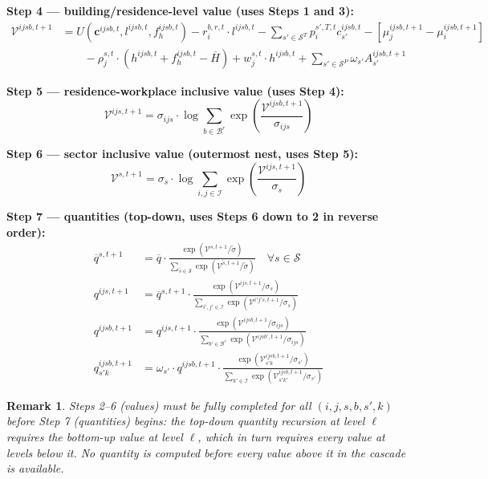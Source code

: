 \documentclass[11pt,a4paper]{article}
\newtheorem{remark}{Remark}
\newcommand{\IV}{\mathcal{V}}
\begin{document}
\textbf{Step 4 — building/residence-level value (uses Steps 1 and 3):}
\begin{align}
    \IV^{ijsb,t+1} &= U(\mathbf{c}^{ijsb,t}, l^{ijsb,t}, f^{ijsb,t}_h) - r^{b,r,t}_i \cdot l^{ijsb,t} - \sum_{s' \in \mathcal{S}^T} p^{s',T,t}_i c^{ijsb,t}_{s'} - \left[\mu^{ijsb, t+1}_{j} - \mu^{ijsb, t+1}_{i}\right] \nonumber \\
    &\qquad - \rho^{s,t}_j \cdot \left( h^{ijsb,t} + f^{ijsb,t}_h - \overline{H} \right) + w_j^{s,t} \cdot h^{ijsb,t} + \sum_{s' \in \mathcal{S}^P} \omega_{s'} A^{ijsb, t+1}_{s'}
    \label{eq:iv_building}
\end{align}

\textbf{Step 5 — residence-workplace inclusive value (uses Step 4):}
\begin{equation}
    \IV^{ijs, t+1} = \sigma_{ijs} \cdot \log \sum_{b \in \mathcal{B}^r} \exp\left(\frac{\IV^{ijsb,t+1}}{\sigma_{ijs}}\right)
    \label{eq:iv_location}
\end{equation}

\textbf{Step 6 — sector inclusive value (outermost nest, uses Step 5):}
\begin{equation}
    \IV^{s, t+1} = \sigma_s \cdot \log \sum_{i,j \in \mathcal{I}} \exp\left(\frac{\IV^{ijs,t+1}}{\sigma_s}\right)
    \label{eq:iv_sector}
\end{equation}

\textbf{Step 7 — quantities (top-down, uses Steps 6 down to 2 in reverse order):}
\begin{align}
    \overline{q}^{s, t+1} &= \overline{q} \cdot \frac{\exp\left(\IV^{s,t+1} / \tilde{\sigma}\right)}{\sum_{\tilde{s} \in \mathcal{S}} \exp\left(\IV^{\tilde{s},t+1} / \tilde{\sigma}\right)} \quad \forall s \in \mathcal{S} \\
    q^{ijs, t+1} &= \overline{q}^{s,t+1} \cdot \frac{\exp\left(\IV^{ijs,t+1} / \sigma_s\right)}{\sum_{i',j' \in \mathcal{I}} \exp\left(\IV^{i'j's,t+1} / \sigma_s\right)} \\
    q^{ijsb, t+1} &= q^{ijs,t+1} \cdot \frac{\exp\left(\IV^{ijsb,t+1} / \sigma_{ijs}\right)}{\sum_{b' \in \mathcal{B}^r} \exp\left(\IV^{ijsb',t+1} / \sigma_{ijs}\right)} \\
    q^{ijsb, t+1}_{s'k} &= \omega_{s'} \cdot q^{ijsb,t+1} \cdot \frac{\exp\left(\IV^{ijsb,t+1}_{s'k} / \sigma_{s'}\right)}{\sum_{k' \in \mathcal{I}} \exp\left(\IV^{ijsb,t+1}_{s'k'} / \sigma_{s'}\right)}
\end{align}

\begin{remark}
Steps 2--6 (values) must be fully completed for all $(i,j,s,b,s',k)$ before Step 7 (quantities) begins: the top-down quantity recursion at level $\ell$ requires the bottom-up value at level $\ell$, which in turn requires every value at levels below it. No quantity is computed before every value above it in the cascade is available.
\end{remark}
\end{document}

